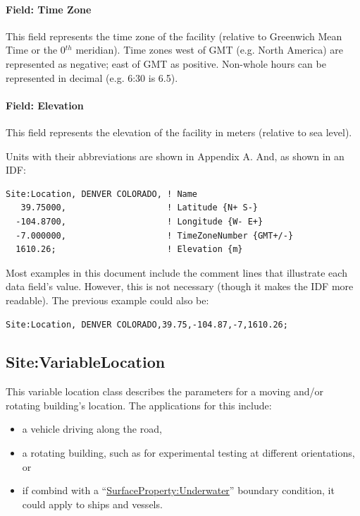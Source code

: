 \paragraph{Field: Time Zone}\label{field-time-zone}

This field represents the time zone of the facility (relative to Greenwich Mean Time or the 0\(^{th}\) meridian). Time zones west of GMT (e.g. North America) are represented as negative; east of GMT as positive. Non-whole hours can be represented in decimal (e.g. 6:30 is 6.5).

\paragraph{Field: Elevation}\label{field-elevation}

This field represents the elevation of the facility in meters (relative to sea level).

Units with their abbreviations are shown in Appendix A. And, as shown in an IDF:

\begin{lstlisting}
Site:Location, DENVER COLORADO, ! Name
   39.75000,                    ! Latitude {N+ S-}
  -104.8700,                    ! Longitude {W- E+}
  -7.000000,                    ! TimeZoneNumber {GMT+/-}
  1610.26;                      ! Elevation {m}
\end{lstlisting}

Most examples in this document include the comment lines that illustrate each data field's value. However, this is not necessary (though it makes the IDF more readable). The previous example could also be:

\begin{lstlisting}
Site:Location, DENVER COLORADO,39.75,-104.87,-7,1610.26;
\end{lstlisting}


\subsection{Site:VariableLocation}\label{sitevariablelocation}

This variable location class describes the parameters for a moving and/or rotating building's location.
The applications for this include:

\begin{itemize}
 \item a vehicle driving along the road,
 \item a rotating building, such as for experimental testing at different orientations, or
 \item if combind with a ``\hyperref[surfacepropertyunderwater]{SurfaceProperty:Underwater}'' boundary condition, it could apply to ships and vessels.
\end{itemize}

